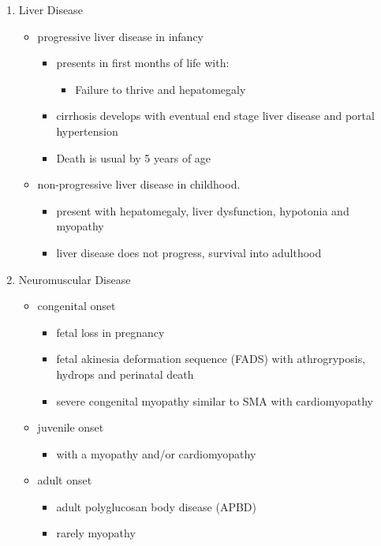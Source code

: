 \documentclass{scrartcl}
\begin{document}
\begin{enumerate}
\item Liver Disease
\label{sec:org5e575de}
\begin{itemize}
\item progressive liver disease in infancy
\begin{itemize}
\item presents in first months of life with:
\begin{itemize}
\item Failure to thrive and hepatomegaly
\end{itemize}
\item cirrhosis develops with eventual end stage liver disease and
portal hypertension
\item Death is usual by 5 years of age
\end{itemize}
\item non-progressive liver disease in childhood.
\begin{itemize}
\item present with hepatomegaly, liver dysfunction, hypotonia and
myopathy
\item liver disease does not progress, survival into adulthood
\end{itemize}
\end{itemize}

\item Neuromuscular Disease
\label{sec:org4ae6804}
\begin{itemize}
\item congenital onset
\begin{itemize}
\item fetal loss in pregnancy
\item fetal akinesia deformation sequence (FADS) with athrogryposis, hydrops and perinatal death
\item severe congenital myopathy similar to SMA with \textpm{} cardiomyopathy
\end{itemize}
\item juvenile onset
\begin{itemize}
\item with a myopathy and/or cardiomyopathy
\end{itemize}
\item adult onset
\begin{itemize}
\item adult polyglucosan body disease (APBD)
\item rarely myopathy
\end{itemize}
\end{itemize}
\end{enumerate}
\end{document}
